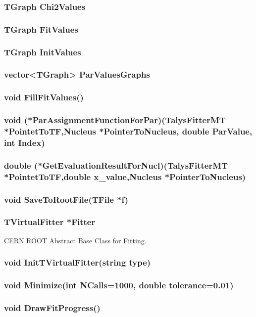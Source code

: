 \documentclass[a4paper,12pt]{extarticle}
\begin{document}
\subsubsection{TGraph Chi2Values}
\subsubsection{TGraph FitValues}
\subsubsection{TGraph InitValues}
\subsubsection{vector<TGraph> ParValuesGraphs}
\subsubsection{void FillFitValues()}
\subsubsection{void (*ParAssignmentFunctionForPar)(TalysFitterMT *PointetToTF,Nucleus *PointerToNucleus, double ParValue, int Index)}
\subsubsection{double (*GetEvaluationResultForNucl)(TalysFitterMT *PointetToTF,double x_value,Nucleus *PointerToNucleus)}
\subsubsection{void SaveToRootFile(TFile *f)}
\subsubsection{TVirtualFitter *Fitter}
CERN ROOT Abstract Base Class for Fitting.
\subsubsection{void InitTVirtualFitter(string type)}
\subsubsection{void Minimize(int NCalls=1000, double tolerance=0.01)}
\subsubsection{void DrawFitProgress()}
\end{document}
